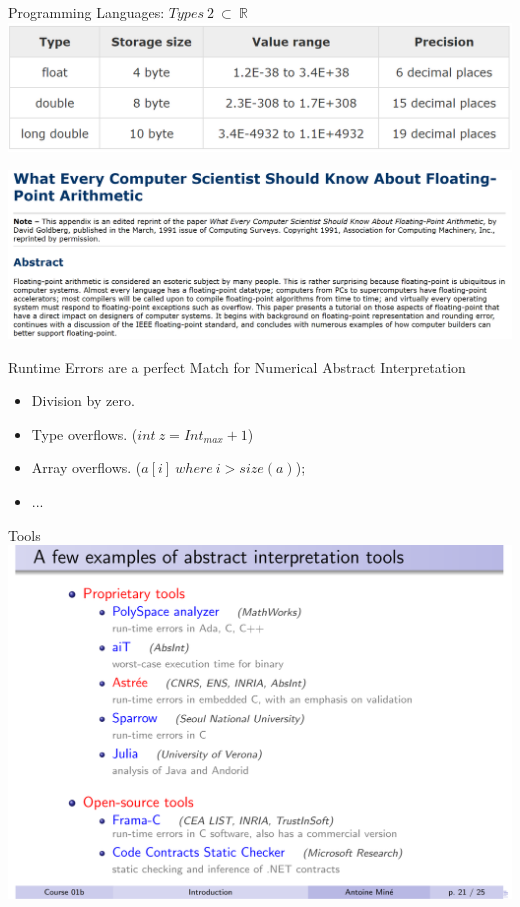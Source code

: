\begin{frame}{Programming Languages: $Types~2~\subset~\mathbb{R}$}
	\centering \includegraphics[scale=0.45]{content/images/static-analysis/RR.png}
     
	\xxx
    \centering \includegraphics[scale=0.3]{content/images/static-analysis/floating.png}
\end{frame}


\begin{frame}{Runtime Errors are a perfect Match for Numerical Abstract Interpretation}
	\begin{itemize}
		\item Division by zero.
		\item Type overflows. ($int~z= Int_{max} + 1$)
		\item Array overflows. ($a[i] ~ where~ i> size(a)$);
		\item ...
	\end{itemize}
    
\end{frame}


\begin{frame}{Tools}
\centering \includegraphics[scale=0.45]{content/images/static-analysis/tools.png}
\end{frame}

